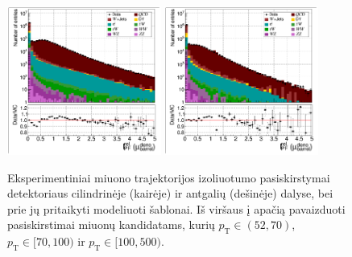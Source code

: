 \documentclass[a4paper, 12pt, oneside]{article}
\newcommand{\pT}{p_{\mathrm{T}}}
\begin{document}
\begin{figure}[H]
	\includegraphics[width=0.45\textwidth]{Kursinis3/TFit_DB_100to500.png}
	\includegraphics[width=0.45\textwidth]{Kursinis3/TFit_DE_100to500.png}
	\caption{\label{fig:templateFit}
		Eksperimentiniai miuono trajektorijos izoliuotumo pasiskirstymai detektoriaus cilindrinėje (kairėje)
		ir  antgalių (dešinėje) dalyse, bei prie jų pritaikyti modeliuoti šablonai.
		Iš viršaus į apačią pavaizduoti pasiskirstimai miuonų kandidatams, kurių $\pT\in(52, 70)$,
		$\pT\in[70, 100)$ ir $\pT\in[100, 500)$.}
\end{figure}
\end{document}
